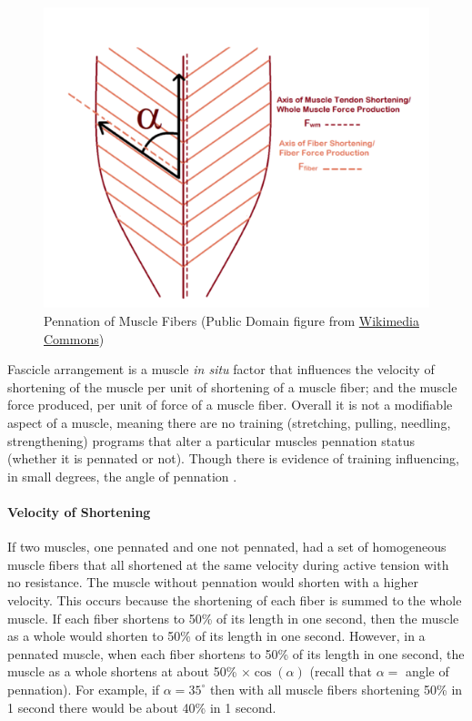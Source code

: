 \begin{figure}[!ht]
    \centering
    \includegraphics[width=1\linewidth]{./figure/pennation.png}
    \caption{Pennation of Muscle Fibers \footnotesize{(Public Domain figure from \href{https://commons.wikimedia.org/wiki/File:Pennation_angle_of_fibers_in_pennate_muscle.png}{Wikimedia Commons})}}
    \label{fig:pennation}
\end{figure}

Fascicle arrangement is a muscle \textit{in situ} factor that influences the velocity of shortening of the muscle per unit of shortening of a muscle fiber; and the muscle force produced, per unit of force of a muscle fiber. Overall it is not a modifiable aspect of a muscle, meaning there are no training (stretching, pulling, needling, strengthening) programs that alter a particular muscles pennation status (whether it is pennated or not). Though there is evidence of training influencing, in small degrees, the angle of pennation \cite{cuthbert_effect_2020}.

\paragraph{Velocity of Shortening}
 
If two muscles, one pennated and one not pennated, had a set of homogeneous muscle fibers that all shortened at the same velocity during active tension with no resistance. The muscle without pennation would shorten with a higher velocity. This occurs because the shortening of each fiber is summed to the whole muscle. If each fiber shortens to 50\% of its length in one second, then the muscle as a whole would shorten to 50\% of its length in one second. However, in a pennated muscle, when each fiber shortens to 50\% of its length in one second, the muscle as a whole shortens at about 50\% $\times \cos(\alpha)$ (recall that $\alpha =$ angle of pennation). For example, if $\alpha = 35^\circ$ then with all muscle fibers shortening 50\% in 1 second there would be about 40\% in 1 second.

